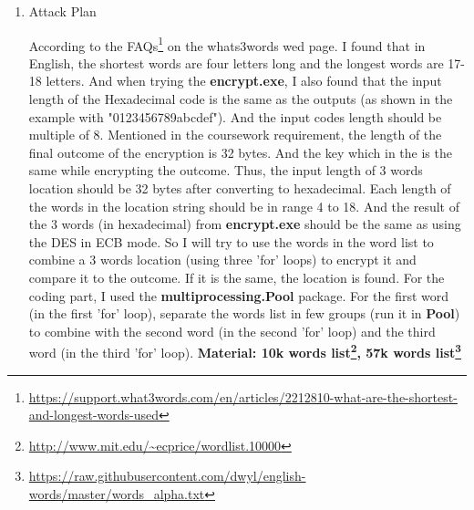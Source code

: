 \documentclass[margin 2cm]{report}
\begin{document}
\begin{enumerate}
\normalsize\item[1)]{Attack Plan}
\begin{spacing}{1.5}
\newline\normalsize\indent\setlength{\parindent}{2em}According to the FAQs\footnote[1]{\url{https://support.what3words.com/en/articles/2212810-what-are-the-shortest-and-longest-words-used}} on the whats3words wed page. I found that in English, the shortest words are four letters long and the longest words are 17-18 letters. And when trying the \textbf{encrypt.exe}, I also found that the input length of the Hexadecimal code is the same as the outputs (as shown in the example with "0123456789abcdef"). And the input codes length should be multiple of 8. \newline Mentioned in the coursework requirement, the length of the final outcome of the encryption is 32 bytes. And the key which in the  is the same while encrypting the outcome. \newline Thus, the input length of 3 words location should be 32 bytes after converting to hexadecimal. Each length of the words in the location string should be in range 4 to 18. And the result of the 3 words (in hexadecimal) from \textbf{encrypt.exe} should be the same as using the DES in ECB mode. So I will try to use the words in the word list to combine a 3 words location (using three 'for' loops) to encrypt it and compare it to the outcome. If it is the same, the location is found. For the coding part, I used the \textbf{multiprocessing.Pool} package. For the first word (in the first 'for' loop), separate the words list in few groups (run it in \textbf{Pool}) to combine with the second word (in the second 'for' loop)  and the third word (in the third 'for' loop). \newline\textbf{Material: 10k words list\footnote[2]{\url{http://www.mit.edu/~ecprice/wordlist.10000}}, 57k words list\footnote[3]{\url{https://raw.githubusercontent.com/dwyl/english-words/master/words_alpha.txt}}}
\end{spacing}



\end{enumerate}
\end{document}
